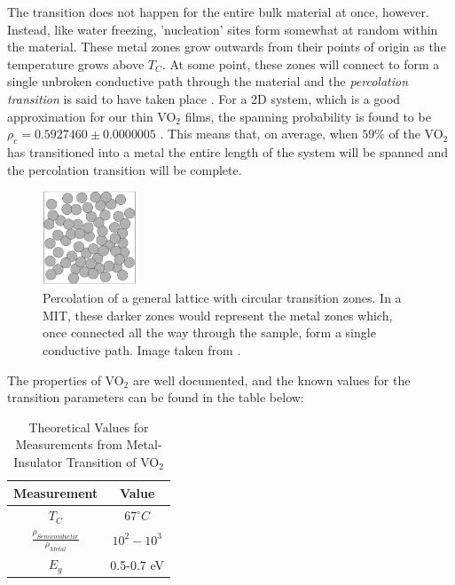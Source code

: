 \documentclass[%
 reprint,
 amsmath,amssymb,
 aps,
 pra,
]{revtex4-1}
\begin{document}
The transition does not happen for the entire bulk material at once, however. Instead, like water freezing, 'nucleation' sites form somewhat at random within the material. These metal zones grow outwards from their points of origin as the temperature grows above $T_C$. At some point, these zones will connect to form a single unbroken conductive path through the material and the \textit{percolation transition} is said to have taken place \cite{perc}. For a 2D system, which is a good approximation for our thin VO$_2$ films, the spanning probability is found to be $\rho_c = 0.592 7460 \pm 0.000 0005 $ \cite{perc,perc2}. This means that, on average, when $59\%$ of the VO$_2$ has transitioned into a metal the entire length of the system will be spanned and the percolation transition will be complete.

\begin{figure}[H]
	\centering
	\includegraphics[width=0.25\textwidth]{percolation.png}
	\caption{Percolation of a general lattice with circular transition zones. In a MIT, these darker zones would represent the metal zones which, once connected all the way through the sample, form a single conductive path. Image taken from \cite{perc}.}
	\label{fig:perc}
\end{figure}

The properties of VO$_2$ are well documented, and the known values for the transition parameters can be found in the table below:

\begin{table}[htbp]
	\begin{center}
		\begin{tabular}{|c|c|}
			\hline \textbf{Measurement} & \textbf{Value} \\
			\hline $T_{C}$ & $67^{\circ} C$\\
			\hline $\frac{\rho_{Semiconductor}}{\rho_{Metal}}$ & $10^{2} - 10^{3}$ \\
			\hline $E_{g}$ & 0.5-0.7 eV\\
			\hline
		\end{tabular}
	\end{center}
	\caption{Theoretical Values for Measurements from Metal-Insulator Transition of VO$_{2}$}
	\label{Tab:VO2Theory}
\end{table}
\end{document}

